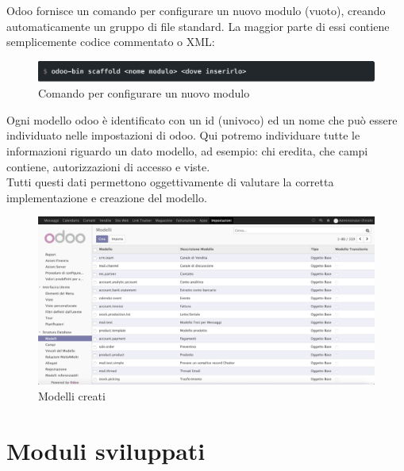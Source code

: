 Odoo fornisce un comando per configurare un nuovo modulo (vuoto), creando automaticamente un gruppo di file standard. La maggior parte di essi contiene semplicemente codice commentato o XML:
\begin{figure}[H]
	\begin{center} \includegraphics[scale=0.6]{figures/scaffold}
		\caption[Comando per configurare un nuovo modulo]{Comando per configurare un nuovo modulo}
		\label{fig:scaffold}
	\end{center}
\end{figure}
\newpage
Ogni modello odoo è identificato con un id (univoco) ed un nome che può essere individuato nelle impostazioni di odoo. Qui potremo individuare tutte le informazioni riguardo un dato modello, ad esempio: chi eredita, che campi contiene, autorizzazioni di accesso e viste. \\
Tutti questi dati permettono oggettivamente di valutare la corretta implementazione e creazione del modello.

\begin{figure}[H]
	\begin{center} \includegraphics[scale=0.3]{figures/Modelli_creati}
		\caption[Modelli creati]{Modelli creati}
		\label{fig:Modelli_creati}
	\end{center}
\end{figure}
\newpage
\section{Moduli sviluppati}

